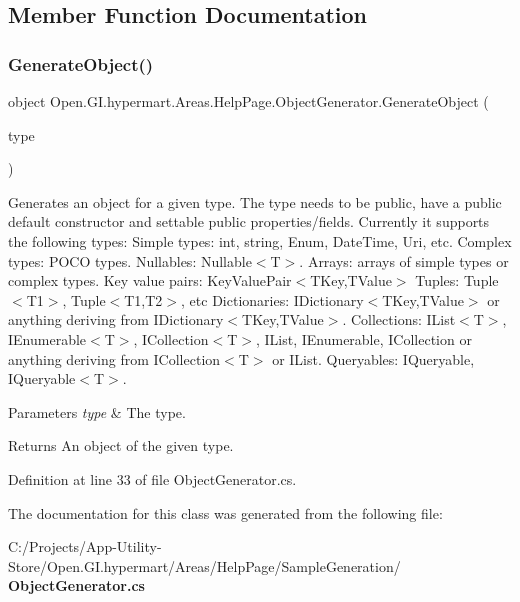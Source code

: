 \subsection{Member Function Documentation}
\mbox{\label{class_open_1_1_g_i_1_1hypermart_1_1_areas_1_1_help_page_1_1_object_generator_a118924d1ff5f565e6e9c2893d36f35d2}} 
\subsubsection{Generate\+Object()}
{\footnotesize\ttfamily object Open.\+G\+I.\+hypermart.\+Areas.\+Help\+Page.\+Object\+Generator.\+Generate\+Object (\begin{DoxyParamCaption}\item[{Type}]{type }\end{DoxyParamCaption})}



Generates an object for a given type. The type needs to be public, have a public default constructor and settable public properties/fields. Currently it supports the following types\+: Simple types\+: int, string, Enum, Date\+Time, Uri, etc. Complex types\+: P\+O\+CO types. Nullables\+: Nullable$<$\+T$>$. Arrays\+: arrays of simple types or complex types. Key value pairs\+: Key\+Value\+Pair$<$\+T\+Key,\+T\+Value$>$ Tuples\+: Tuple$<$\+T1$>$, Tuple$<$\+T1,\+T2$>$, etc Dictionaries\+: I\+Dictionary$<$\+T\+Key,\+T\+Value$>$ or anything deriving from I\+Dictionary$<$\+T\+Key,\+T\+Value$>$. Collections\+: I\+List$<$\+T$>$, I\+Enumerable$<$\+T$>$, I\+Collection$<$\+T$>$, I\+List, I\+Enumerable, I\+Collection or anything deriving from I\+Collection$<$\+T$>$ or I\+List. Queryables\+: I\+Queryable, I\+Queryable$<$\+T$>$. 


\begin{DoxyParams}{Parameters}
{\em type} & The type.\\
\hline
\end{DoxyParams}
\begin{DoxyReturn}{Returns}
An object of the given type.
\end{DoxyReturn}


Definition at line 33 of file Object\+Generator.\+cs.



The documentation for this class was generated from the following file\+:\begin{DoxyCompactItemize}
\item 
C\+:/\+Projects/\+App-\/\+Utility-\/\+Store/\+Open.\+G\+I.\+hypermart/\+Areas/\+Help\+Page/\+Sample\+Generation/\textbf{ Object\+Generator.\+cs}\end{DoxyCompactItemize}
